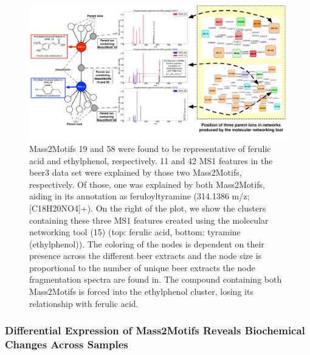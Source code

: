 \begin{figure}[!htbp]
\centering\includegraphics[width=1.0\linewidth]{07-lda/figures/combinedm2m.pdf}
\centering\caption{Mass2Motifs 19 and 58 were found to be representative of ferulic acid and ethylphenol, respectively. 11 and 42 MS1 features in the beer3 data set were explained by those two Mass2Motifs, respectively. Of those, one was explained by both Mass2Motifs, aiding in its annotation as feruloyltyramine (314.1386 m/z; [C18H20NO4]+). On the right of the plot, we show the clusters containing these three MS1 features created using the molecular networking tool (15) (top: ferulic acid, bottom: tyramine (ethylphenol)). The coloring of the nodes is dependent on their presence across the different beer extracts and the node size is proportional to the number of unique beer extracts the node fragmentation spectra are found in. The compound containing both Mass2Motifs is forced into the ethylphenol cluster, losing its relationship with ferulic acid.\label{fig:m2lda-combined-m2m}}
\end{figure}
 
\subsubsection{Differential Expression of Mass2Motifs Reveals Biochemical Changes Across Samples}

